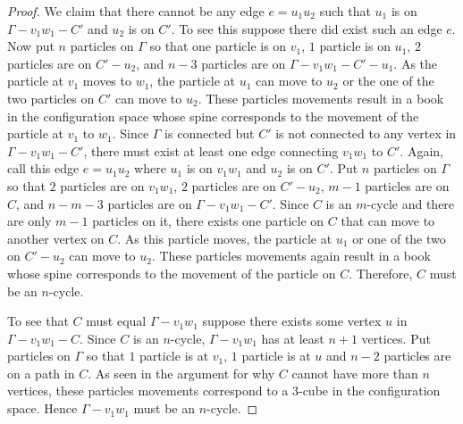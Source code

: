 \begin{proof}
We claim that there cannot be any edge \(e = u_1 u_2\) such that \(u_1\) is on \(\Gamma - v_1 w_1 - C'\) and \(u_2\) is on \(C'\).
To see this suppose there did exist such an edge \(e\).
Now put \(n\) particles on \(\Gamma\) so that one particle is on \(v_1\), \(1\) particle is on \(u_1\), \(2\) particles are on \(C' - u_2\), 
and \(n - 3\) particles are on \(\Gamma - v_1 w_1 - C' - u_1\).
As the particle at \(v_1\) moves to \(w_1\), the particle at \(u_1\) can move to \(u_2\) or the one of the two particles on \(C'\) can move to \(u_2\).
These particles movements result in a book in the configuration space whose spine corresponds to the movement of the particle at \(v_1\) to \(w_1\).
Since \(\Gamma\) is connected but \(C'\) is not connected to any vertex in \(\Gamma - v_1 w_1 - C'\),
there must exist at least one edge connecting \(v_1 w_1\) to \(C'\).
Again, call this edge \(e = u_1 u_2\) where \(u_1\) is on \(v_1 w_1\) and \(u_2\) is on \(C'\).
Put \(n\) particles on \(\Gamma\) so that \(2\) particles are on \(v_1 w_1\), \(2\) particles are on \(C' - u_2\), \(m - 1\) particles are on \(C\),
and \(n - m - 3\) particles are on \(\Gamma - v_1 w_1 - C'\).
Since \(C\) is an \(m\)-cycle and there are only \(m - 1\) particles on it, there exists one particle on \(C\) that can move to another vertex on \(C\).
As this particle moves, the particle at \(u_1\) or one of the two on \(C' - u_2\) can move to \(u_2\).
These particles movements again result in a book whose spine corresponds to the movement of the particle on \(C\).
Therefore, \(C\) must be an \(n\)-cycle.

To see that \(C\) must equal \(\Gamma - v_1 w_1\) suppose there exists some vertex \(u\) in \(\Gamma - v_1 w_1 - C\).
Since \(C\) is an \(n\)-cycle, \(\Gamma - v_1 w_1\) has at least \(n + 1\) vertices.
Put particles on \(\Gamma\) so that \(1\) particle is at \(v_1\), \(1\) particle is at \(u\) and \(n-2\) particles are on a path in \(C\).
As seen in the argument for why \(C\) cannot have more than \(n\) vertices, these particles movements correspond to a \(3\)-cube in the configuration
space. Hence \(\Gamma - v_1 w_1\) must be an \(n\)-cycle.
\end{proof}

